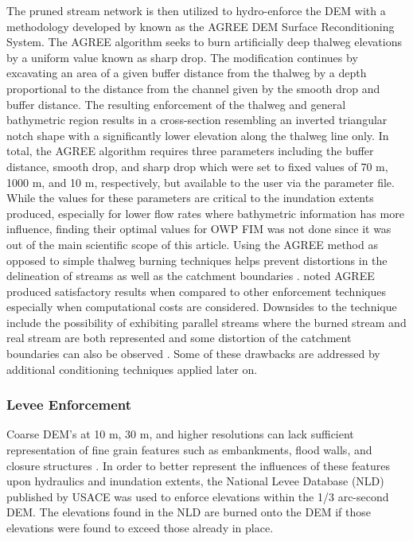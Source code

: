 \documentclass[draft]{dependencies/agujournal2019}
\begin{document}
The pruned stream network is then utilized to hydro-enforce the DEM with a methodology developed by  known as the AGREE DEM Surface Reconditioning System. 
The AGREE algorithm seeks to burn artificially deep thalweg elevations by a uniform value known as sharp drop. 
The modification continues by excavating an area of a given buffer distance from the thalweg by a depth proportional to the distance from the channel given by the smooth drop and buffer distance. 
The resulting enforcement of the thalweg and general bathymetric region results in a cross-section resembling an inverted triangular notch shape with a significantly lower elevation along the thalweg line only.
In total, the AGREE algorithm requires three parameters including the buffer distance, smooth drop, and sharp drop which were set to fixed values of 70 m, 1000 m, and 10 m, respectively, but available to the user via the parameter file.
While the values for these parameters are critical to the inundation extents produced, especially for lower flow rates where bathymetric information has more influence, finding their optimal values for OWP FIM was not done since it was out of the main scientific scope of this article.
Using the AGREE method as opposed to simple thalweg burning techniques helps prevent distortions in the delineation of streams as well as the catchment boundaries \cite{saunders1995grid,saunders1996gis,mizgalewicz1996modeling,hellweger1997agree,quenzer1998gis,baker2006comparison}.
 noted AGREE produced satisfactory results when compared to other enforcement techniques especially when computational costs are considered. 
Downsides to the technique include the possibility of exhibiting parallel streams where the burned stream and real stream are both represented \cite{hellweger1997agree,saunders1999preparation} and some distortion of the catchment boundaries can also be observed \cite{saunders1999preparation,saunders1996gis}.
Some of these drawbacks are addressed by additional conditioning techniques applied later on.
%
\subsubsection{Levee Enforcement}
%
Coarse DEM's at 10 m, 30 m, and higher resolutions can lack sufficient representation of fine grain features such as embankments, flood walls, and closure structures \cite{arundel2018assimilation,dobbs2010evaluation,wang2005comparison,sanders2007evaluation}.
In order to better represent the influences of these features upon hydraulics and inundation extents, the National Levee Database (NLD) published by USACE was used to enforce elevations within the 1/3 arc-second DEM.
The elevations found in the NLD are burned onto the DEM if those elevations were found to exceed those already in place.
%
\end{document}
